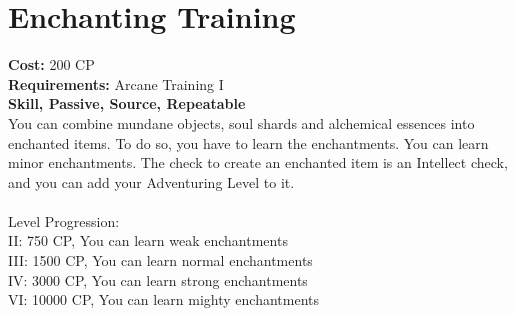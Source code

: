 \section{Enchanting Training}
\textbf{Cost:} 200 CP\\
\textbf{Requirements:} Arcane Training I\\
\textbf{Skill, Passive, Source, Repeatable}\\
You can combine mundane objects, soul shards and alchemical essences into enchanted items. To do so, you have to learn the enchantments. You can learn minor enchantments. The check to create an enchanted item is an Intellect check, and you can add your Adventuring Level to it.\\
\\
Level Progression:\\
II: 750 CP, You can learn weak enchantments\\
III: 1500 CP, You can learn normal enchantments\\
IV: 3000 CP, You can learn strong enchantments\\
VI: 10000 CP, You can learn mighty enchantments\\